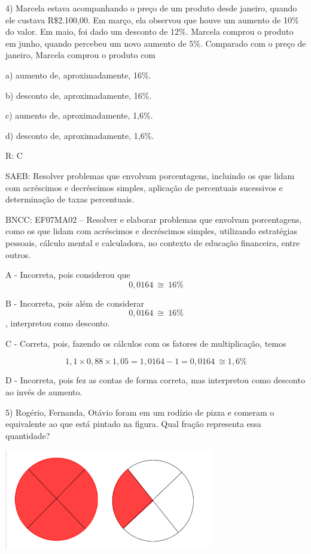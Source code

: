 4) Marcela estava acompanhando o preço de um produto desde janeiro,
quando ele custava R\$2.100,00. Em março, ela observou que houve um
aumento de 10\% do valor. Em maio, foi dado um desconto de 12\%. Marcela
comprou o produto em junho, quando percebeu um novo aumento de 5\%.
Comparado com o preço de janeiro, Marcela comprou o produto com

a) aumento de, aproximadamente, 16\%.

b) desconto de, aproximadamente, 16\%.

c) aumento de, aproximadamente, 1,6\%.

d) desconto de, aproximadamente, 1,6\%.

R: C

SAEB: Resolver problemas que envolvam porcentagens, incluindo os que
lidam com acréscimos e decréscimos simples, aplicação de percentuais
sucessivos e determinação de taxas percentuais.

BNCC: EF07MA02 -- Resolver e elaborar problemas que envolvam
porcentagens, como os que lidam com acréscimos e decréscimos simples,
utilizando estratégias pessoais, cálculo mental e calculadora, no
contexto de educação financeira, entre outros.

A - Incorreta, pois considerou que \[0,0164\  \cong \ 16\%\]

B - Incorreta, pois além de considerar \[0,0164\  \cong \ 16\%\],
interpretou como desconto.

C - Correta, pois, fazendo os cálculos com os fatores de multiplicação,
temos

\[1,1 \times 0,88 \times 1,05 = 1,0164 - 1 = 0,0164\  \cong 1,6\%\]

D - Incorreta, pois fez as contas de forma correta, mas interpretou como
desconto ao invés de aumento.

5) Rogério, Fernanda, Otávio foram em um rodízio de pizza e comeram o
equivalente ao que está pintado na figura. Qual fração representa essa
quantidade?

\includegraphics[width=3.625in,height=1.72917in]{./imgSAEB_7_MAT/media/image95.png}

